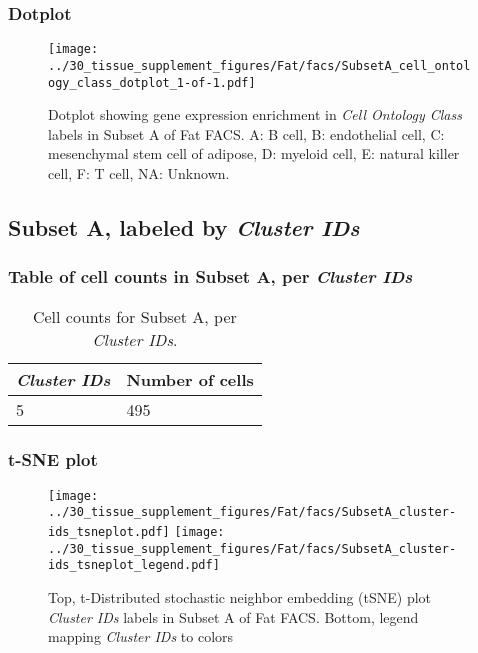 \clearpage

\subsubsection{Dotplot}
\begin{figure}[h]
\centering
\texttt{[image: ../30\_tissue\_supplement\_figures/Fat/facs/SubsetA\_cell\_ontology\_class\_dotplot\_1-of-1.pdf]}

\caption{ Dotplot  showing gene expression enrichment in \emph{Cell Ontology Class} labels in Subset A of Fat FACS. A: B cell, B: endothelial cell, C: mesenchymal stem cell of adipose, D: myeloid cell, E: natural killer cell, F: T cell, NA: Unknown.}
\end{figure}


\clearpage

\subsection{Subset A, labeled by \emph{Cluster IDs}}
\subsubsection{Table of cell counts in Subset A, per \emph{Cluster IDs}}\begin{table}[h]
\centering
\label{my-label}
\begin{tabular}{@{}ll@{}}
\toprule

\emph{Cluster IDs}& Number of cells \\ \midrule
5 & 495 \\
\bottomrule
\end{tabular}
\caption{Cell counts for Subset A, per \emph{Cluster IDs}.}
\end{table}

\clearpage
\subsubsection{t-SNE plot}
\begin{figure}[h]
\centering
\texttt{[image: ../30\_tissue\_supplement\_figures/Fat/facs/SubsetA\_cluster-ids\_tsneplot.pdf]}
\texttt{[image: ../30\_tissue\_supplement\_figures/Fat/facs/SubsetA\_cluster-ids\_tsneplot\_legend.pdf]}
\caption{Top, t-Distributed stochastic neighbor embedding (tSNE) plot  \emph{Cluster IDs} labels in Subset A of Fat FACS. Bottom, legend mapping \emph{Cluster IDs} to colors}
\end{figure}


